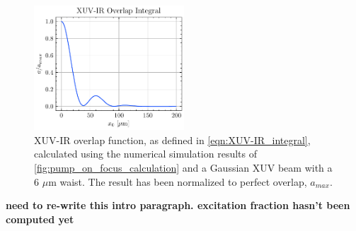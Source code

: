 \begin{figure}
	\centering
	\includegraphics[width=0.5\textwidth]{figures/chap2/XUV-IR_overlap_integral.pdf}
	\caption{XUV-IR overlap function, as defined in \cref{eqn:XUV-IR_integral}, calculated using the numerical simulation results of \cref{fig:pump_on_focus_calculation} and a Gaussian XUV beam with a 6 $\mu$m waist. The result has been normalized to perfect overlap, $a_{max}$.}
	\label{fig:XUV-IR_integral}
\end{figure}

\textbf{need to re-write this intro paragraph. excitation fraction hasn't been computed yet}

